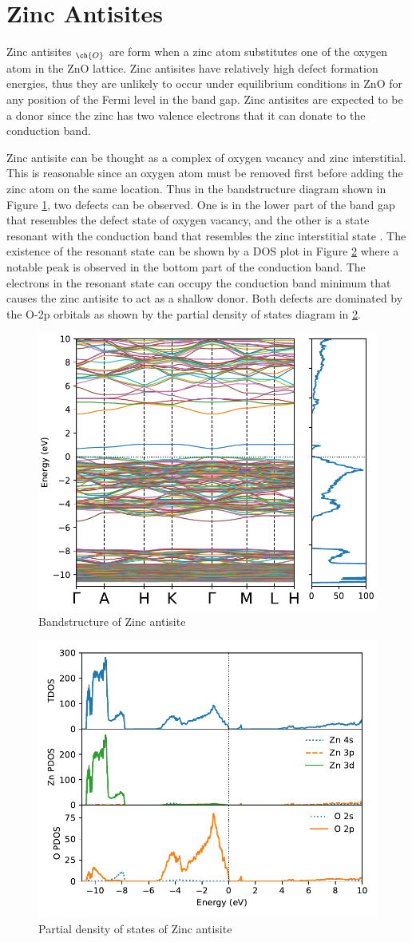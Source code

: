 \clearpage

\section{Zinc Antisites}
Zinc antisites $_{\ch{O}}$ are form when a zinc atom substitutes one of the oxygen atom in the ZnO lattice.
Zinc antisites have relatively high defect formation energies, thus they are unlikely to occur under equilibrium conditions in ZnO for any position of the Fermi level in the band gap. Zinc antisites are expected to be a donor since the  zinc has two valence electrons that it can donate to the conduction band.

Zinc antisite can be thought as a complex of oxygen vacancy and zinc interstitial. This is reasonable since an oxygen atom must be removed first before adding the zinc atom on the same location.  Thus in the bandstructure diagram shown in Figure \ref{fig:bands.Zn-anti}, two defects can be observed. One is in the lower part of the band gap that resembles the defect state of oxygen vacancy, and the other is a state resonant with the conduction band that resembles the zinc interstitial state \citep{Janotti2007}. The existence of the resonant state can be shown by a DOS plot in Figure \ref{fig:dos.Zn-anti} where a notable peak is observed in the bottom part of the conduction band. The electrons in the resonant state can occupy the conduction band minimum that causes the zinc antisite to act as a shallow donor. Both defects are dominated by the O-2p orbitals as shown by the partial density of states diagram in \ref{fig:dos.Zn-anti}.

\begin{figure}[tbh!]
	\centering
	\includegraphics[width=0.6\linewidth]{"images/rnd/band-dos_Zn_anti"}
	\caption[Bandstructure of Zinc antisite]{Bandstructure of Zinc antisite}
	\label{fig:bands.Zn-anti}
\end{figure}

\begin{figure}[tbh!]
	\centering
	\includegraphics[width=0.6\linewidth]{"images/rnd/dos-pdos_Zn_anti"}
	\caption[Partial density of states of Zinc antisite]{Partial density of states of Zinc antisite}
	\label{fig:dos.Zn-anti}
\end{figure}


